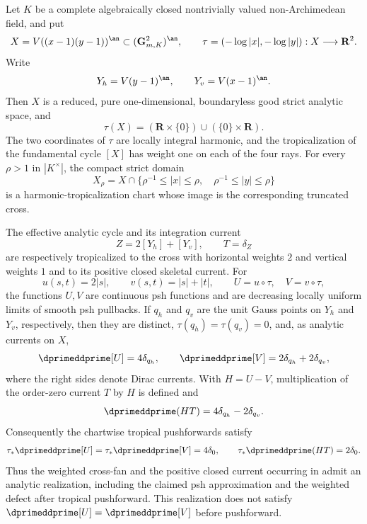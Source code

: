 \begin{proposition}\label{prop:verified-cross-analytic-realization}
Let $K$ be a complete algebraically closed nontrivially valued
non-Archimedean field, and put
\[
 X=V((x-1)(y-1))^{\an}\subset(\mathbf G_{m,K}^2)^{\an},
 \qquad
 \tau=(-\log|x|,-\log|y|):X\longrightarrow\mathbf R^2.
\]
Write
\[
 Y_h=V(y-1)^{\an},\qquad Y_v=V(x-1)^{\an}.
\]
Then $X$ is a reduced, pure one-dimensional, boundaryless good strict
analytic space, and
\[
 \tau(X)=(\mathbf R\times\{0\})\cup(\{0\}\times\mathbf R).
\]
The two coordinates of $\tau$ are locally integral harmonic, and the
tropicalization of the fundamental cycle $[X]$ has weight one on each of
the four rays.  For every $\rho>1$ in $|K^\times|$, the compact strict
domain
\[
 X_\rho=X\cap\{\rho^{-1}\leq|x|\leq\rho,\quad
                       \rho^{-1}\leq|y|\leq\rho\}
\]
is a harmonic-tropicalization chart whose image is the corresponding
truncated cross.

The effective analytic cycle and its integration current
\[
 Z=2[Y_h]+[Y_v],\qquad T=\delta_Z
\]
are respectively tropicalized to the cross with horizontal weights $2$
and vertical weights $1$ and to its positive closed skeletal current.
For
\[
 u(s,t)=2|s|,\qquad v(s,t)=|s|+|t|,
 \qquad U=u\circ\tau,\quad V=v\circ\tau,
\]
the functions $U,V$ are continuous psh functions and are decreasing
locally uniform limits of smooth psh pullbacks.  If $q_h$ and $q_v$ are the
unit Gauss points on $Y_h$ and $Y_v$, respectively, then they are distinct,
$\tau(q_h)=\tau(q_v)=0$, and, as analytic currents on $X$,
\[
 \dprimeddprime[U]=4\delta_{q_h},\qquad
 \dprimeddprime[V]=2\delta_{q_h}+2\delta_{q_v},
\]
where the right sides denote Dirac currents.  With $H=U-V$, multiplication
of the order-zero current $T$ by $H$ is defined and
\[
 \dprimeddprime(HT)=4\delta_{q_h}-2\delta_{q_v}.
\]
Consequently the chartwise tropical pushforwards satisfy
\[
 \tau_*\dprimeddprime[U]=\tau_*\dprimeddprime[V]=4\delta_0,
 \qquad
 \tau_*\dprimeddprime(HT)=2\delta_0.
\]
Thus the weighted cross-fan and the positive closed current occurring in
 admit an analytic realization, including the
claimed psh approximation and the weighted defect after tropical
pushforward.  This realization does not satisfy
$\dprimeddprime[U]=\dprimeddprime[V]$ before pushforward.
\end{proposition}
